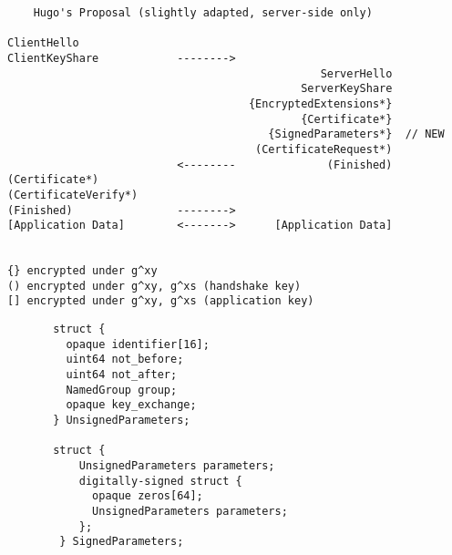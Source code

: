 \documentclass[helvetica]{seminar}
\begin{document}
\begin{slide}
\begin{footnotesize}
\begin{verbatim}
    Hugo's Proposal (slightly adapted, server-side only)

ClientHello
ClientKeyShare            -------->
                                                ServerHello
                                             ServerKeyShare
                                     {EncryptedExtensions*}
                                             {Certificate*}
                                        {SignedParameters*}  // NEW
                                      (CertificateRequest*)
                          <--------              (Finished)
(Certificate*)
(CertificateVerify*)
(Finished)                -------->
[Application Data]        <------->      [Application Data]


{} encrypted under g^xy
() encrypted under g^xy, g^xs (handshake key)
[] encrypted under g^xy, g^xs (application key)
\end{verbatim}
\end{footnotesize}
\end{slide}


\begin{slide}
\begin{footnotesize}
\begin{verbatim}
       struct {
         opaque identifier[16];
         uint64 not_before;
         uint64 not_after;
         NamedGroup group;
         opaque key_exchange;
       } UnsignedParameters;

       struct {
           UnsignedParameters parameters;
           digitally-signed struct {
             opaque zeros[64];
             UnsignedParameters parameters;
           };
        } SignedParameters;
\end{verbatim}
\end{footnotesize}
\end{slide}
\end{document}
